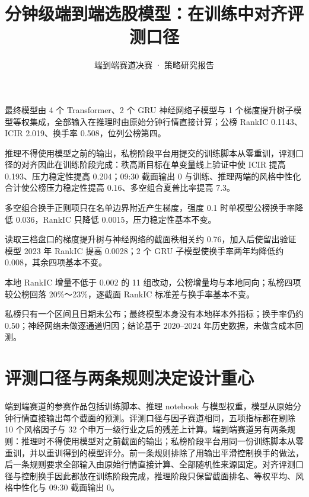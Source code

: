 \documentclass[UTF8,a4paper,zihao=-4,fontset=none]{ctexart}
\title{分钟级端到端选股模型：在训练中对齐评测口径}
\subtitle{端到端赛道决赛 · 策略研究报告}
\begin{document}
\makereporttitle

\begin{keypoints}
\item {}最终模型由 4 个 Transformer、2 个 GRU 神经网络子模型与 1 个梯度提升树子模型等权集成，全部输入在推理时由原始分钟行情直接计算；公榜 RankIC 0.1143、ICIR 2.019、换手率 0.508，位列公榜第四。
\item {}推理不得使用模型之前的输出，私榜阶段平台用提交的训练脚本从零重训，评测口径的对齐因此在训练阶段完成：秩高斯目标在单变量线上验证中使 ICIR 提高 0.193、压力稳定性提高 0.204；09:30 截面输出 0 与训练、推理两端的风格中性化合计使公榜压力稳定性提高 0.16、多空组合夏普比率提高 7.3。
\item {}多空组合换手正则项只在名单边界附近产生梯度，强度 0.1 时单模型公榜换手率降低 0.036，RankIC 只降低 0.0015，压力稳定性基本不变。
\item {}读取三档盘口的梯度提升树与神经网络的截面秩相关约 0.76，加入后使留出验证模型 2023 年 RankIC 提高 0.0028；2 个 GRU 子模型使换手率两年均降低约 0.008，其余四项基本不变。
\item {}本地 RankIC 增量不低于 0.002 的 11 组改动，公榜增量均与本地同向；私榜四项较公榜回落 20\%～23\%，逐截面 RankIC 标准差与换手率基本不变。
\item {}私榜只有一个区间且日期未公布；最终模型本身没有本地样本外指标；换手率仍约 0.50；神经网络未做逐通道归因；结论基于 2020–2024 年历史数据，未做含成本回测。
\end{keypoints}

{\linespread{1.1}\selectfont\tableofcontents}
\newpage

\section{评测口径与两条规则决定设计重心}\label{sec:rules}

端到端赛道的参赛作品包括训练脚本、推理 notebook 与模型权重，模型从原始分钟行情直接输出每个截面的预测。评测口径与因子赛道相同，五项指标都在剔除 10 个风格因子与 32 个申万一级行业之后的残差上计算。端到端赛道另有两条规则：推理时不得使用模型对之前截面的输出；私榜阶段平台用同一份训练脚本从零重训，并以重训得到的模型评分。前一条规则排除了用输出平滑控制换手的做法，后一条规则要求全部输入由原始行情直接计算、全部随机性来源固定。对齐评测口径与控制换手因此都放在训练阶段完成，推理阶段只保留截面排名、等权平均、风格中性化与 09:30 截面输出 0。
\end{document}
